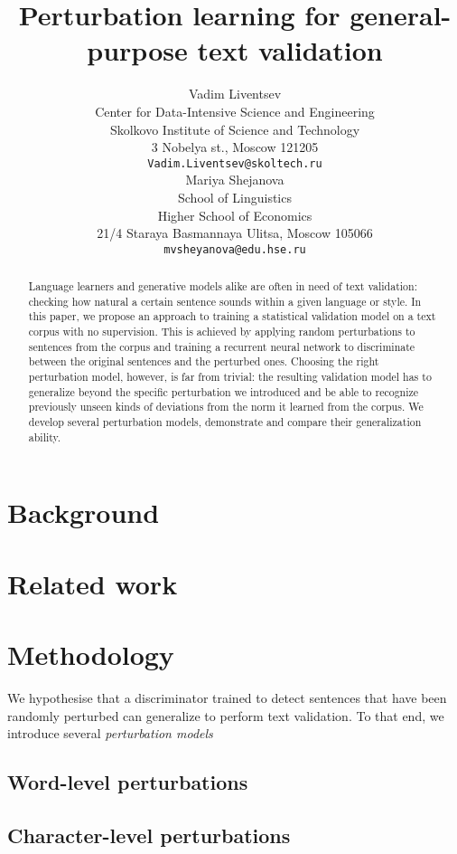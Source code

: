 \documentclass[11pt,a4paper]{article}
\title{Perturbation learning for general-purpose text validation}
\author{Vadim Liventsev \\
  Center for Data-Intensive Science and Engineering \\
  Skolkovo Institute of Science and Technology\\
  3 Nobelya st., Moscow 121205 \\
  {\tt Vadim.Liventsev@skoltech.ru} \\\And
  Mariya Shejanova \\
  School of Linguistics \\
  Higher School of Economics \\
  21/4 Staraya Basmannaya Ulitsa, Moscow 105066 \\
  {\tt mvsheyanova@edu.hse.ru} \\}
\date{}
\begin{document}
\maketitle
\begin{abstract}
  Language learners and generative models alike are often in need of text validation: checking how natural a certain sentence sounds within a given language or style.
  In this paper, we propose an approach to training a statistical validation model on a text corpus with no supervision.
  This is achieved by applying random perturbations to sentences from the corpus and training a recurrent neural network to discriminate between the original sentences and the perturbed ones.
  Choosing the right perturbation model, however, is far from trivial: the resulting validation model has to generalize beyond the specific perturbation we introduced and be able to recognize previously unseen kinds of deviations from the norm it learned from the corpus.
  We develop several perturbation models, demonstrate and compare their generalization ability.
\end{abstract}

\section{Background}
\label{sec:background}

\section{Related work}
\label{sec:related-work}

\section{Methodology}
\label{sec:methodology}

We hypothesise that a discriminator trained to detect sentences that have been randomly perturbed can generalize to perform text validation. To that end, we introduce several \emph{perturbation models} 

\subsection{Word-level perturbations}

\subsection{Character-level perturbations}
\end{document}
